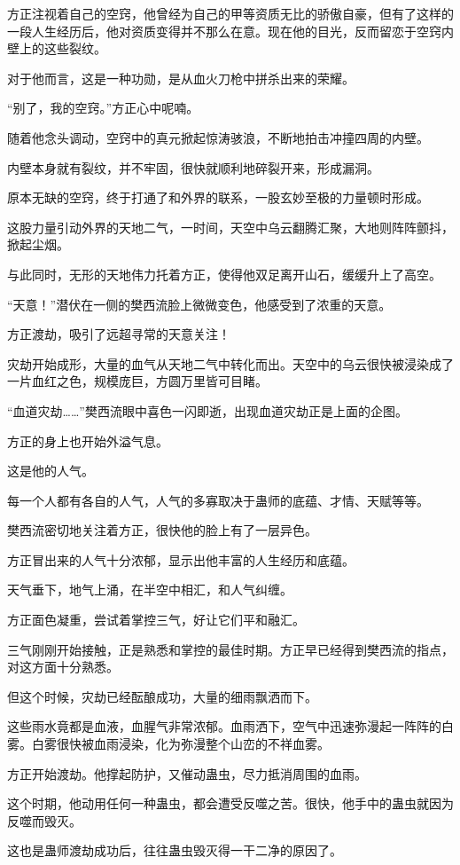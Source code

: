 \begin{this_body}
方正注视着自己的空窍，他曾经为自己的甲等资质无比的骄傲自豪，但有了这样的一段人生经历后，他对资质变得并不那么在意。现在他的目光，反而留恋于空窍内壁上的这些裂纹。

对于他而言，这是一种功勋，是从血火刀枪中拼杀出来的荣耀。

“别了，我的空窍。”方正心中呢喃。

随着他念头调动，空窍中的真元掀起惊涛骇浪，不断地拍击冲撞四周的内壁。

内壁本身就有裂纹，并不牢固，很快就顺利地碎裂开来，形成漏洞。

原本无缺的空窍，终于打通了和外界的联系，一股玄妙至极的力量顿时形成。

这股力量引动外界的天地二气，一时间，天空中乌云翻腾汇聚，大地则阵阵颤抖，掀起尘烟。

与此同时，无形的天地伟力托着方正，使得他双足离开山石，缓缓升上了高空。

“天意！”潜伏在一侧的樊西流脸上微微变色，他感受到了浓重的天意。

方正渡劫，吸引了远超寻常的天意关注！

灾劫开始成形，大量的血气从天地二气中转化而出。天空中的乌云很快被浸染成了一片血红之色，规模庞巨，方圆万里皆可目睹。

“血道灾劫……”樊西流眼中喜色一闪即逝，出现血道灾劫正是上面的企图。

方正的身上也开始外溢气息。

这是他的人气。

每一个人都有各自的人气，人气的多寡取决于蛊师的底蕴、才情、天赋等等。

樊西流密切地关注着方正，很快他的脸上有了一层异色。

方正冒出来的人气十分浓郁，显示出他丰富的人生经历和底蕴。

天气垂下，地气上涌，在半空中相汇，和人气纠缠。

方正面色凝重，尝试着掌控三气，好让它们平和融汇。

三气刚刚开始接触，正是熟悉和掌控的最佳时期。方正早已经得到樊西流的指点，对这方面十分熟悉。

但这个时候，灾劫已经酝酿成功，大量的细雨飘洒而下。

这些雨水竟都是血液，血腥气非常浓郁。血雨洒下，空气中迅速弥漫起一阵阵的白雾。白雾很快被血雨浸染，化为弥漫整个山峦的不祥血雾。

方正开始渡劫。他撑起防护，又催动蛊虫，尽力抵消周围的血雨。

这个时期，他动用任何一种蛊虫，都会遭受反噬之苦。很快，他手中的蛊虫就因为反噬而毁灭。

这也是蛊师渡劫成功后，往往蛊虫毁灭得一干二净的原因了。


\end{this_body}
